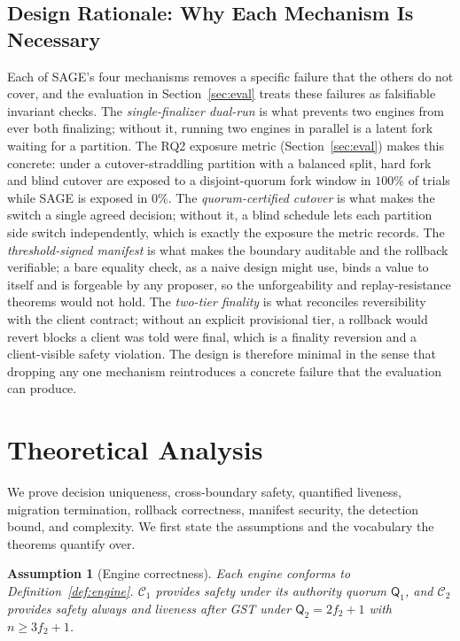 \documentclass[journal]{IEEEtran}
\newtheorem{assumption}{Assumption}
\begin{document}
\subsection{Design Rationale: Why Each Mechanism Is Necessary}
Each of SAGE's four mechanisms removes a specific failure that the others do not cover, and the
evaluation in Section~\ref{sec:eval} treats these failures as falsifiable invariant checks.
The \emph{single-finalizer dual-run} is what prevents two engines from ever both finalizing;
without it, running two engines in parallel is a latent fork waiting for a partition. The RQ2
exposure metric (Section~\ref{sec:eval}) makes this concrete: under a cutover-straddling
partition with a balanced split, hard fork and blind cutover are exposed to a disjoint-quorum
fork window in $100\%$ of trials while SAGE is exposed in $0\%$. The
\emph{quorum-certified cutover} is what makes the switch a single agreed decision; without it, a
blind schedule lets each partition side switch independently, which is exactly the exposure the
metric records. The \emph{threshold-signed manifest} is what makes the boundary
auditable and the rollback verifiable; a bare equality check, as a naive design might use, binds
a value to itself and is forgeable by any proposer, so the unforgeability and replay-resistance
theorems would not hold. The \emph{two-tier finality} is what reconciles reversibility with the
client contract; without an explicit provisional tier, a rollback would revert blocks a client
was told were final, which is a finality reversion and a client-visible safety violation. The
design is therefore minimal in the sense that dropping any one mechanism reintroduces a concrete
failure that the evaluation can produce.

\section{Theoretical Analysis}
\label{sec:analysis}

We prove decision uniqueness, cross-boundary safety, quantified liveness, migration
termination, rollback correctness, manifest security, the detection bound, and complexity. We
first state the assumptions and the vocabulary the theorems quantify over.

\begin{assumption}[Engine correctness]
\label{as:engines}
Each engine conforms to Definition~\ref{def:engine}. $\mathcal{C}_1$ provides safety under its
authority quorum $\mathsf{Q}_1$, and $\mathcal{C}_2$ provides safety always and liveness after
GST under $\mathsf{Q}_2=2f_2+1$ with $n\ge 3f_2+1$.
\end{assumption}
\end{document}
